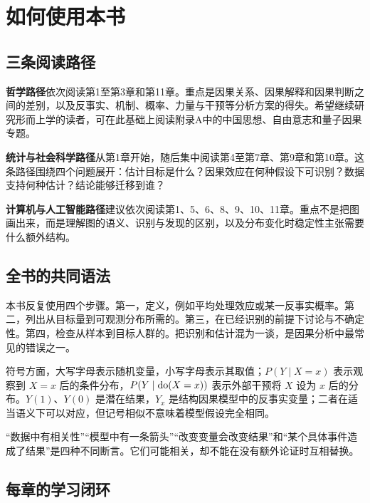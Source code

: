\chapter*{如何使用本书}

\section*{三条阅读路径}

\textbf{哲学路径}依次阅读第1至第3章和第11章。重点是因果关系、因果解释和因果判断之间的差别，以及反事实、机制、概率、力量与干预等分析方案的得失。希望继续研究形而上学的读者，可在此基础上阅读附录A中的中国思想、自由意志和量子因果专题。

\textbf{统计与社会科学路径}从第1章开始，随后集中阅读第4至第7章、第9章和第10章。这条路径围绕四个问题展开：估计目标是什么？因果效应在何种假设下可识别？数据支持何种估计？结论能够迁移到谁？

\textbf{计算机与人工智能路径}建议依次阅读第1、5、6、8、9、10、11章。重点不是把图画出来，而是理解图的语义、识别与发现的区别，以及分布变化时稳定性主张需要什么额外结构。

\section*{全书的共同语法}

本书反复使用四个步骤。第一，定义，例如平均处理效应或某一反事实概率。第二，列出从目标量到可观测分布所需的。第三，在已经识别的前提下讨论与不确定性。第四，检查从样本到目标人群的。把识别和估计混为一谈，是因果分析中最常见的错误之一。

符号方面，大写字母表示随机变量，小写字母表示其取值；$P(Y\mid X=x)$ 表示观察到 $X=x$ 后的条件分布，$P(Y\mid\operatorname{do}(X=x))$ 表示外部干预将 $X$ 设为 $x$ 后的分布。$Y(1)$、$Y(0)$ 是潜在结果，$Y_x$ 是结构因果模型中的反事实变量；二者在适当语义下可以对应，但记号相似不意味着模型假设完全相同。

\begin{keypoint}
“数据中有相关性”“模型中有一条箭头”“改变变量会改变结果”和“某个具体事件造成了结果”是四种不同断言。它们可能相关，却不能在没有额外论证时互相替换。
\end{keypoint}

\section*{每章的学习闭环}

